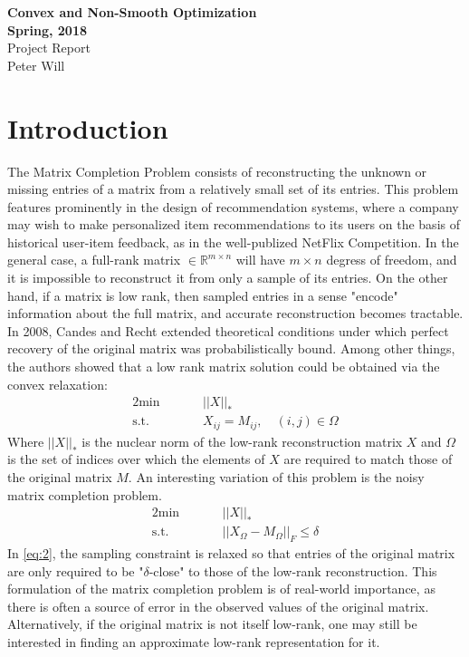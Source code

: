 \documentclass{article}
\begin{document}
\begin{center}
{\bf
Convex and Non-Smooth Optimization \\
Spring, 2018 \\
}
Project Report \\
Peter Will
\end{center}
\vspace{.2in}
\section{Introduction} \label{introduction}
The Matrix Completion Problem consists of reconstructing the unknown or missing entries of a matrix from a relatively small set of its entries.  This problem features prominently in the design of recommendation systems, where a company may wish to make personalized item recommendations to its users on the basis of historical user-item feedback, as in the well-publized NetFlix Competition.  In the general case, a full-rank matrix $\in \mathbb{R}^{m \times n}$ will have $m \times n$ degress of freedom, and it is impossible to reconstruct it from only a sample of its entries.  On the other hand, if a matrix is low rank, then sampled entries in a sense "encode" information about the full matrix, and accurate reconstruction becomes tractable.  In 2008, Candes and Recht extended theoretical conditions under which perfect recovery of the original matrix was probabilistically bound.  Among other things, the authors showed that a low rank matrix solution could be obtained via the convex relaxation:
\begin{alignat}{2} \label{eq:1}
\textrm{min}& \quad &&||X||_* \\
\textrm{s.t.}& &&X_{ij} = M_{ij}, \quad (i,j) \in \Omega \nonumber
\end{alignat}
Where $||X||_*$ is the nuclear norm of the low-rank reconstruction matrix $X$ and $\Omega$ is the set of indices over which the elements of $X$ are required to match those of the original matrix $M$.  An interesting variation of this problem is the noisy matrix completion problem.
\begin{alignat}{2} \label{eq:2}
\textrm{min}& \quad &&||X||_* \\
\textrm{s.t.}& &&||X_{\Omega} - M_{\Omega}||_F \le \delta \nonumber
\end{alignat}
In \ref{eq:2}, the sampling constraint is relaxed so that entries of the original matrix are only required to be "$\delta$-close" to those of the low-rank reconstruction.  This formulation of the matrix completion problem is of real-world importance, as there is often a source of error in the observed values of the original matrix.  Alternatively, if the original matrix is not itself low-rank, one may still be interested in finding an approximate low-rank representation for it.  
\end{document}
